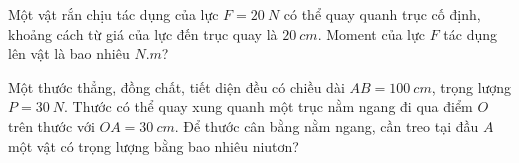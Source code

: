 \begin{ex}%
Một vật rắn chịu tác dụng của lực $F=20 \ N$ có thể quay quanh trục cố định, khoảng cách từ giá của lực đến trục quay là $20\ cm$. Moment của lực $F$ tác dụng lên vật là bao nhiêu $N.m$?
\loigiai{}
\end{ex}
\begin{ex}%
Một thước thẳng, đồng chất, tiết diện đều có chiều dài $AB=100 \ cm$, trọng lượng $P=30 \ N$. Thước có thể quay xung quanh một trục nằm ngang đi qua điểm $O$ trên thước với $OA=30 \ cm$. Để thước cân bằng nằm ngang, cần treo tại đầu $A$ một vật có trọng lượng bằng bao nhiêu niutơn?
\loigiai{}
\end{ex}
















